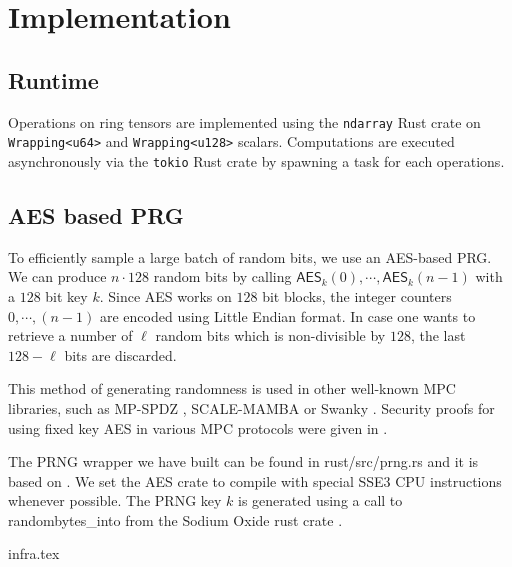 \section{Implementation}


\subsection{Runtime}

Operations on ring tensors are implemented using the \texttt{ndarray} Rust crate on
\texttt{Wrapping<u64>} and \texttt{Wrapping<u128>} scalars. Computations are executed
asynchronously via the \texttt{tokio} Rust crate by spawning a task for each operations.


\subsection{AES based PRG}
\label{sec:aes}

To efficiently sample a large batch of random bits, we use an AES-based PRG. We can produce $n \cdot 128$ random bits by calling $\mathsf{AES}_k(0), \cdots, \mathsf{AES}_k(n-1)$ with a $128$ bit key $k$. 
Since AES works on $128$ bit blocks, the integer counters $0, \cdots, (n-1)$
are encoded using Little Endian format. In case one wants to retrieve a
number of $\ell$ random bits which is non-divisible by $128$, the last
$128 - \ell$ bits are discarded.

This method of generating
randomness is used in other well-known MPC libraries, such as MP-SPDZ
\cite{CCS:Keller20}, SCALE-MAMBA \cite{SCALE} or Swanky \cite{url-swanky}.
Security proofs for using fixed key AES in various MPC protocols were given
in \cite{SP:GKWY20}.

The PRNG wrapper we have built can be found in \textsf{rust/src/prng.rs} and
it is based on \cite{url-cargo-aes}.  We set the \textsf{AES} crate to
compile with special SSE3 CPU instructions whenever possible.
The PRNG key $k$ is generated using a call to \textsf{randombytes\_into}
from the Sodium Oxide rust crate \cite{url-sodiumoxide}.


{infra.tex}
